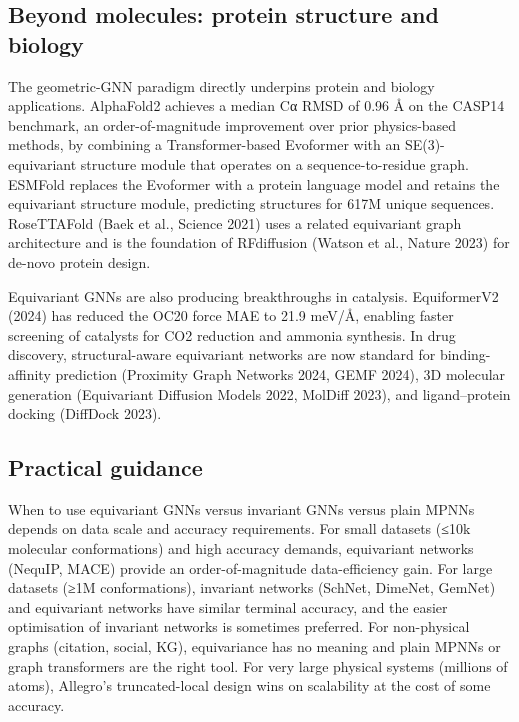 \documentclass{article}
\begin{document}
\subsection{Beyond molecules: protein structure and biology}\label{beyond-molecules-protein-structure-and-biology}

The geometric-GNN paradigm directly underpins protein and biology applications. AlphaFold2 \citep{jumper20212021} achieves a median Cα RMSD of 0.96 Å on the CASP14 benchmark, an order-of-magnitude improvement over prior physics-based methods, by combining a Transformer-based Evoformer with an SE(3)-equivariant structure module that operates on a sequence-to-residue graph. ESMFold \citep{lin20232023} replaces the Evoformer with a protein language model and retains the equivariant structure module, predicting structures for 617M unique sequences. RoseTTAFold (Baek et al., Science 2021) uses a related equivariant graph architecture and is the foundation of RFdiffusion (Watson et al., Nature 2023) for de-novo protein design.

Equivariant GNNs are also producing breakthroughs in catalysis. EquiformerV2 (2024) has reduced the OC20 force MAE to 21.9 meV/Å, enabling faster screening of catalysts for CO2 reduction and ammonia synthesis. In drug discovery, structural-aware equivariant networks are now standard for binding-affinity prediction (Proximity Graph Networks 2024, GEMF 2024), 3D molecular generation (Equivariant Diffusion Models 2022, MolDiff 2023), and ligand--protein docking (DiffDock 2023).

\subsection{Practical guidance}\label{practical-guidance}

When to use equivariant GNNs versus invariant GNNs versus plain MPNNs depends on data scale and accuracy requirements. For small datasets (≤10k molecular conformations) and high accuracy demands, equivariant networks (NequIP, MACE) provide an order-of-magnitude data-efficiency gain. For large datasets (≥1M conformations), invariant networks (SchNet, DimeNet, GemNet) and equivariant networks have similar terminal accuracy, and the easier optimisation of invariant networks is sometimes preferred. For non-physical graphs (citation, social, KG), equivariance has no meaning and plain MPNNs or graph transformers are the right tool. For very large physical systems (millions of atoms), Allegro's truncated-local design wins on scalability at the cost of some accuracy.
\end{document}

